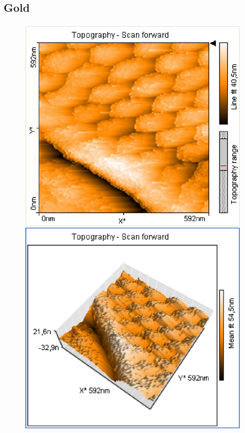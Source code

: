 \documentclass[12pt]{article}
\begin{document}
\subsection{Gold}
\begin{figure}[H]  
\begin{minipage}{0.4\linewidth}
\centering
\includegraphics[width=0.9\linewidth]{../plot/data/goldgitter/goldgitter.eps}
\end{minipage}
\begin{minipage}{0.2\linewidth}
\centering
\end{minipage}
\begin{minipage}{0.4\linewidth}

\end{minipage}
\end{figure}
\end{document}
